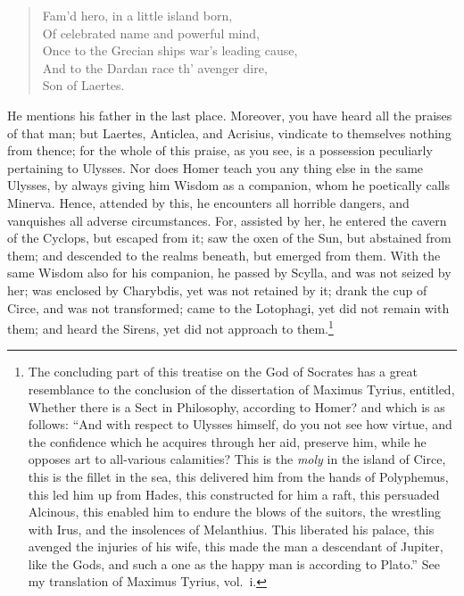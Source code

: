 \documentclass{article}
\begin{document}
\begin{verse}
Fam'd hero, in a little island born,\\
Of celebrated name and powerful mind,\\
Once to the Grecian ships war's leading cause,\\
And to the Dardan race th' avenger dire,\\
Son of Laertes.
\end{verse}

\noindent He mentions his father in the last place. Moreover, you have heard
all the praises of that man; but Laertes, Anticlea, and Acrisius, vindicate
to themselves nothing from thence; for the whole of this praise, as you see, is
a possession peculiarly pertaining to Ulysses. Nor does Homer teach you any
thing else in the same Ulysses, by always giving him Wisdom as a companion,
whom he poetically calls Minerva. Hence, attended by this, he encounters all
horrible dangers, and vanquishes all adverse circumstances. For, assisted by
her, he entered the cavern of the Cyclops, but escaped from it; saw the oxen of
the Sun, but abstained from them; and descended to the realms beneath, but
emerged from them. With the same Wisdom also for his companion, he passed by
Scylla, and was not seized by her; was enclosed by Charybdis, yet was not
retained by it; drank the cup of Circe, and was not transformed; came to the
Lotophagi, yet did not remain with them; and heard the Sirens, yet did not
approach to them.\footnote{The concluding part of this treatise on the God of
Socrates has a great resemblance to the conclusion of the dissertation of
Maximus Tyrius, entitled, Whether there is a Sect in Philosophy,
according to Homer? and which is as follows: ``And with respect to Ulysses
himself, do you not see how virtue, and the confidence which he acquires
through her aid, preserve him, while he opposes art to all-various calamities?
This is the \textit{moly} in the island of Circe, this is the fillet in the
sea, this delivered him from the hands of Polyphemus, this led him up from
Hades, this constructed for him a raft, this persuaded Alcinous, this enabled
him to endure the blows of the suitors, the wrestling with Irus, and the
insolences of Melanthius. This liberated his palace, this avenged the injuries
of his wife, this made the man a descendant of Jupiter, like the Gods, and such
a one as the happy man is according to Plato.'' See my translation of Maximus
Tyrius, vol.~i.}
\end{document}
